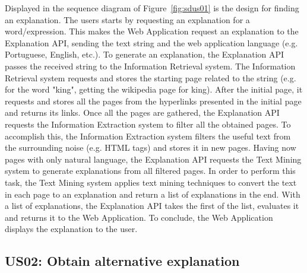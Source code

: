 Displayed in the sequence diagram of Figure~\ref{fig:sdus01} is the design for finding an explanation.
The users starts by requesting an explanation for a word/expression.
This makes the Web Application request an explanation to the Explanation API, sending the text string and the web application language (e.g. Portuguese, English, etc.).
To generate an explanation, the Explanation API passes the received string to the Information Retrieval system.
The Information Retrieval system requests and stores the starting page related to the string (e.g. for the word "king", getting the wikipedia page for king).
After the initial page, it requests and stores all the pages from the hyperlinks presented in the initial page and returns its links.
Once all the pages are gathered, the Explanation API requests the Information Extraction system to filter all the obtained pages.
To accomplish this, the Information Extraction system filters the useful text from the surrounding noise (e.g. HTML tags) and stores it in new pages.
Having now pages with only natural language, the Explanation API requests the Text Mining system to generate explanations from all filtered pages.
In order to perform this task, the Text Mining system applies text mining techniques to convert the text in each page to an explanation and return a list of explanations in the end.
With a list of explanations, the Explanation API takes the first of the list, evaluates it and returns it to the Web Application.
To conclude, the Web Application displays the explanation to the user.

\subsection{US02: Obtain alternative explanation}

